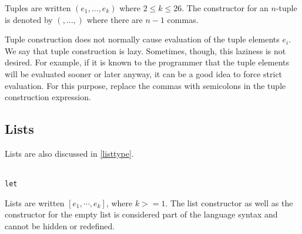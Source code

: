 Tuples are written $(e_1, ..., e_k)$ where $2\le k \le 26$.
The constructor for an $n$-tuple is denoted by $(,...,)$ where there are $n-1$ commas.

Tuple construction does not normally cause evaluation of the tuple elements $e_i$. We say that tuple construction is lazy. Sometimes, though, this laziness is not desired. For example, if it is known to the programmer that the tuple elements will be evaluated sooner or later anyway, it can be a good idea to force strict evaluation. For this purpose, replace the commas with semicolons in the tuple construction expression.

\subsection{Lists} \label{listterm} 

Lists are also discussed in \autoref{listtype}.

\begin{flushleft}
 \sym{[]}  
  \alt{} \bracka{}\brackz{}
  \alt{} \bracka{}  \brackz{}  
  \alt{} \bracka{} \sym{$|$} \brackz{} \\
  \term{$\leftarrow$} 
  \alt {}
  \alt  \texttt{let} \bracea{}  \bracez{}
\end{flushleft}

Lists are written $[e_1, \cdots, e_k]$, where $k>=1$. The list constructor \sym{:} as well as the constructor for the empty list \sym{[]} is considered part of the language syntax and cannot be hidden or redefined.


